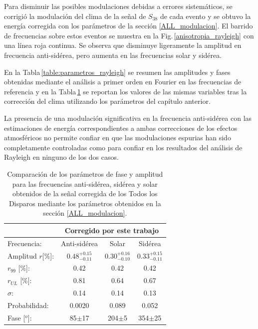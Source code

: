 		
		Para disminuir las posibles modulaciones debidas a errores sistemáticos, se corrigió la modulación del clima de la  señal de $S_{38}$ de cada evento y se obtuvo la energía corregida con los parámetros de la sección \ref{ALL_modulacion}. El barrido de frecuencias sobre estos eventos se muestra en la Fig.\,\ref{anisotropia_rayleigh} con una línea roja continua. Se observa que disminuye ligeramente la amplitud en frecuencia anti-sidérea, pero aumenta en las frecuencias solar y sidérea.


		En la Tabla\,\ref{table:parametros_rayleigh} se resumen las amplitudes y fases obtenidas mediante el análisis a primer orden en Fourier en las frecuencias de referencia  y en la Tabla\,\ref{table:parametros_rayleigh_correccion} se reportan los valores de las mismas variables tras la corrección del clima utilizando los parámetros del capítulo anterior.


		La presencia de una modulación significativa en la frecuencia anti-sidérea con las estimaciones de energía correspondientes a ambas correcciones de los efectos atmosféricos no permite confiar en que las modulaciones espurias han sido completamente controladas como para confiar en los resultados del análisis de Rayleigh en ninguno de los dos casos. 
		
		\begin{table}[H]
			\centering
			\begin{tabular}{rc|c|c|}
				\cline{2-4}
				\multicolumn{1}{r|}{} & \multicolumn{3}{c|}{Corregido por este  trabajo} \\ \hline
				\multicolumn{1}{|l|}{Frecuencia:      } & Anti-sidérea          & Solar        	 				& Sidérea        \\ \hline
				\multicolumn{1}{|l|}{Amplitud $r$[\%]:} & $0.48^{+0.15}_{-0.11}$& $0.30^{+0.16}_{-0.10}$        & $0.33^{+0.15}_{-0.11}$ \\
				\multicolumn{1}{|l|}{$r_{99}$ [\%]:   } & 0.42                  & 0.42                          & 0.42       \\
				\multicolumn{1}{|l|}{$r_{UL}$ [\%]:   } & 0.81                  & 0.64                          & 0.67       \\
				\multicolumn{1}{|l|}{$\sigma$:        } & 0.14                  & 0.14                          & 0.13          \\\hline
				\multicolumn{1}{|l|}{Probabilidad:    } & 0.0020                  & 0.089                       & 0.052          \\
				\multicolumn{1}{|l|}{Fase [$^o$]:            } & 85$\pm$17            & 204$\pm$5                    	& 354$\pm$25    \\\hline 
			\end{tabular}
			\caption{Comparación de los parámetros de fase y amplitud para las frecuencias anti-sidérea, sidérea y solar obtenidos de la señal corregida  de los  Todos los Disparos mediante los parámetros obtenidos en la sección \ref{ALL_modulacion}.}
			\label{table:parametros_rayleigh_correccion}
			\end{table}
	
